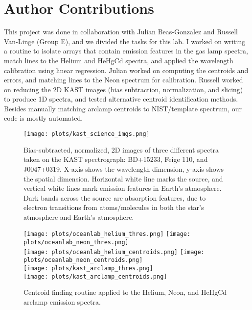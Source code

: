 \documentclass[preprint]{aastex62}
\begin{document}
\section{Author Contributions}
This project was done in collaboration with Julian Beas-Gonzalez and Russell Van-Linge (Group
E), and we divided the tasks for this lab. I worked on writing a routine to isolate arrays that contain emission features in the gas lamp spectra, match lines to the Helium and HeHgCd spectra, and applied the wavelength calibration using linear regression. Julian worked on computing the centroids and errors, and matching lines to the Neon spectrum for calibration. Russell worked on reducing the 2D KAST images (bias subtraction, normalization, and slicing) to produce 1D spectra, and tested alternative centroid identification methods. Besides manually matching arclamp centroids to NIST/template spectrum, our code is mostly automated.

\begin{figure}[H]
\begin{center}
\texttt{[image: plots/kast\_science\_imgs.png]} 
\caption{Bias-subtracted, normalized, 2D images of three different spectra taken on the KAST spectrograph: BD+15233, Feige 110, and J0047+0319. X-axis shows the wavelength dimension, y-axis shows the spatial dimension. Horizontal white line marks the source, and vertical white lines mark emission features in Earth's atmosphere. Dark bands across the source are absorption features, due to electron transitions from atoms/molecules in both the star's atmosphere and Earth's atmosphere.} \label{fig:science_images}
\end{center}
\end{figure}

\begin{figure}[H]
\begin{center}
\texttt{[image: plots/oceanlab\_helium\_thres.png]}
\texttt{[image: plots/oceanlab\_neon\_thres.png]} \\
\texttt{[image: plots/oceanlab\_helium\_centroids.png]}
\texttt{[image: plots/oceanlab\_neon\_centroids.png]} \\
\texttt{[image: plots/kast\_arclamp\_thres.png]} \\
\texttt{[image: plots/kast\_arclamp\_centroids.png]} 
\caption{Centroid finding routine applied to the Helium, Neon, and HeHgCd arclamp emission spectra.} \label{fig:centoid}
\end{center}
\end{figure}
\end{document}
